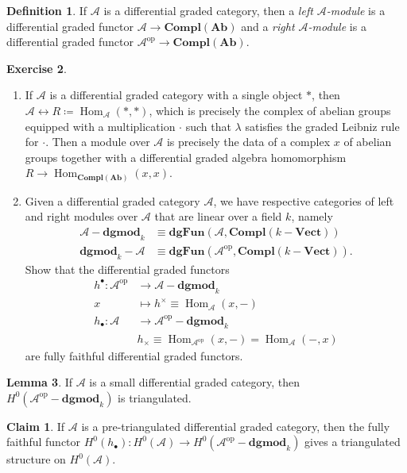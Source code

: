 \documentclass[10pt,letterpaper,cm]{nupset}
\theoremstyle{definition}
\newtheorem{definition}{Definition}[subsection]
\theoremstyle{theorem}
\newtheorem{lemma}[definition]{Lemma}
\newtheorem*{claim}{Claim}
\newtheorem{exercise}[definition]{Exercise}
\theoremstyle{remark}
\newcommand{\A}{\mathcal A}
\newcommand{\1}{\mathbf{1}}
\renewcommand{\a}{\mathscr{A}}
\newcommand{\0}{\vec 0}
\DeclareMathOperator{\op}{op}
\DeclareMathOperator{\Hom}{Hom}
\begin{document}
\begin{definition}
If $\a$ is a differential graded category, then a \textit{left $\a$-module} is a differential graded functor $\a \to \mathbf{Compl}(\mathbf{Ab})$ and a \textit{right $\a$-module} is a differential graded functor $\a^{\op} \to \mathbf{Compl}(\mathbf{Ab})$.
\end{definition}

\begin{exercise} $ $
\begin{enumerate}
\item If $ \a$ is a differential graded category with a single object $\ast$, then $\a \longleftrightarrow R \coloneqq \Hom_{\a}(\ast, \ast)$, which is precisely the complex of abelian groups equipped with a multiplication $\cdot$ such that $\lambda$ satisfies the graded Leibniz rule for $\cdot$.  Then a module over $\a$ is precisely the data of a complex $x$ of abelian groups together with a differential graded algebra homomorphism $R \to \Hom_{\mathbf{Compl}(\mathbf{Ab})}(x, x)$.
\item  Given a differential graded category $\a$, we have respective categories of left and right modules over $\a$  that are linear over a field $k$, namely 
\begin{align*}
  \a{-}\mathbf{dgmod}_k  & \equiv \mathbf{dgFun}(\A, \mathbf{Compl}(k{-}\mathbf{Vect}))
\\  \mathbf{dgmod}_k{-}\a & \equiv \mathbf{dgFun}(\A^{\op}, \mathbf{Compl}(k{-}\mathbf{Vect})).
\end{align*} Show that the differential graded functors
\begin{align*}
h^{\bullet} : \a^{\op} & \to  \a{-}\mathbf{dgmod}_k  
\\ x & \mapsto h^{\times} \equiv \Hom_{\a}(x, {-})
\\ h_{\bullet} : \a & \to \a^{\op}{-}\mathbf{dgmod}_k
\\ & h_{\times} \equiv \Hom_{\a^{\op}}(x, {-}) = \Hom_{\a}({-}, x)
\end{align*} are fully faithful differential graded functors.
\end{enumerate}
\end{exercise}

\begin{lemma}
If $ \a$ is a small differential graded category, then $H^0(\a^{\op}{-}\mathbf{dgmod}_k)$ is triangulated. 
\end{lemma}

\begin{claim}
If $ \a$ is a pre-triangulated differential graded category, then the fully faithful  functor $H^{0}(h_{\bullet}) : H^0(\a) \to H^0(\a^{\op}{-}\mathbf{dgmod}_k)$ gives a triangulated structure on $H^0(\a)$. 
\end{claim}
\end{document}
